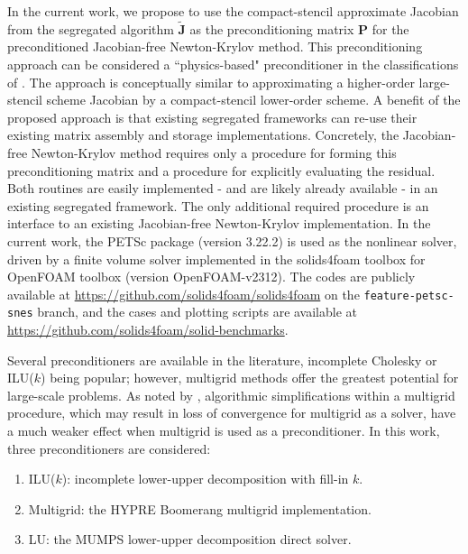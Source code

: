 \documentclass[sn-mathphys,Numbered]{sn-jnl}%
\newcommand{\bb}{\boldsymbol}
\begin{document}
In the current work, we propose to use the compact-stencil approximate Jacobian from the segregated algorithm $\tilde{\bb{J}}$ as the preconditioning matrix $\bb{P}$ for the preconditioned Jacobian-free Newton-Krylov method.
This preconditioning approach can be considered a ``physics-based" preconditioner in the classifications of \citet{Knoll2004}.
The approach is conceptually similar to approximating a higher-order large-stencil scheme Jacobian by a compact-stencil lower-order scheme.
A benefit of the proposed approach is that existing segregated frameworks can re-use their existing matrix assembly and storage implementations.
Concretely, the Jacobian-free Newton-Krylov method requires only a procedure for forming this preconditioning matrix and a procedure for explicitly evaluating the residual.
Both routines are easily implemented - and are likely already available - in an existing segregated framework.
The only additional required procedure is an interface to an existing Jacobian-free Newton-Krylov implementation.
In the current work, the PETSc package (version 3.22.2) \cite{PETSc} is used as the nonlinear solver, driven by a finite volume solver implemented in the solids4foam toolbox \citep{Cardiff2018, Tukovic2018} for OpenFOAM toolbox \citep{Weller1998} (version OpenFOAM-v2312).
The codes are publicly available at \url{https://github.com/solids4foam/solids4foam} on the \texttt{feature-petsc-snes} branch, and the cases and plotting scripts are available at \url{https://github.com/solids4foam/solid-benchmarks}.

Several preconditioners are available in the literature, incomplete Cholesky or ILU($k$) being popular; however, multigrid methods offer the greatest potential for large-scale problems.
As noted by \citet{Knoll2004}, algorithmic simplifications within a multigrid procedure, which may result in loss of convergence for multigrid as a solver, have a much weaker effect when multigrid is used as a preconditioner.
In this work, three preconditioners are considered:
\begin{enumerate}
	\item ILU($k$): incomplete lower-upper decomposition with fill-in $k$. %
	\item Multigrid: the HYPRE Boomerang \citep{hypre} multigrid implementation.
	\item LU: the MUMPS \citep{MUMPS:1, MUMPS:2} lower-upper decomposition direct solver.
\end{enumerate}
\end{document}
